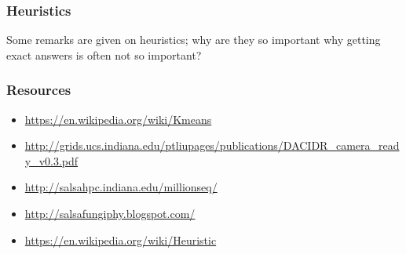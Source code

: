 \subsubsection{Heuristics}\label{heuristics}

Some remarks are given on heuristics; why are they so important why
getting exact answers is often not so important?

\subsubsection{Resources}\label{resources}

\begin{itemize}

\item
  \url{https://en.wikipedia.org/wiki/Kmeans}
\item
  \url{http://grids.ucs.indiana.edu/ptliupages/publications/DACIDR_camera_ready_v0.3.pdf}
\item
  \url{http://salsahpc.indiana.edu/millionseq/}
\item
  \url{http://salsafungiphy.blogspot.com/}
\item
  \url{https://en.wikipedia.org/wiki/Heuristic}
\end{itemize}
